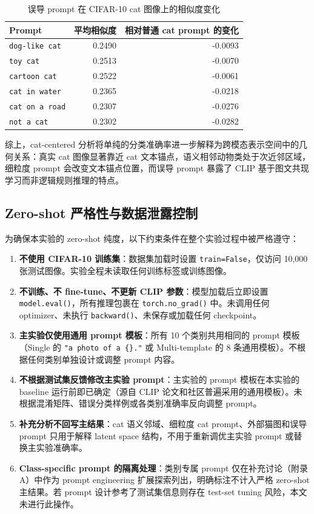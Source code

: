 \documentclass[12pt,a4paper]{ctexart}
\begin{document}
\begin{table}[H]
\centering
\caption{误导 prompt 在 CIFAR-10 cat 图像上的相似度变化}
\label{tab:misleading-prompts}
\begin{tabular}{lrr}
\toprule
Prompt & 平均相似度 & 相对普通 cat prompt 的变化 \\
\midrule
\texttt{dog-like cat} & 0.2490 & -0.0093 \\
\texttt{toy cat}      & 0.2513 & -0.0070 \\
\texttt{cartoon cat}  & 0.2522 & -0.0061 \\
\texttt{cat in water} & 0.2365 & -0.0218 \\
\texttt{cat on a road}& 0.2307 & -0.0276 \\
\texttt{not a cat}    & 0.2302 & -0.0282 \\
\bottomrule
\end{tabular}
\end{table}

综上，cat-centered 分析将单纯的分类准确率进一步解释为跨模态表示空间中的几何关系：真实 cat 图像显著靠近 cat 文本锚点，语义相邻动物类处于次近邻区域，细粒度 prompt 会改变文本锚点位置，而误导 prompt 暴露了 CLIP 基于图文共现学习而非逻辑规则推理的特点。

\subsection{Zero-shot 严格性与数据泄露控制}

为确保本实验的 zero-shot 纯度，以下约束条件在整个实验过程中被严格遵守：

\begin{enumerate}
    \item \textbf{不使用 CIFAR-10 训练集}：数据集加载时设置 \texttt{train=False}，仅访问 10,000 张测试图像。实验全程未读取任何训练标签或训练图像。
    \item \textbf{不训练、不 fine-tune、不更新 CLIP 参数}：模型加载后立即设置 \texttt{model.eval()}，所有推理包裹在 \texttt{torch.no\_grad()} 中。未调用任何 optimizer、未执行 \texttt{backward()}、未保存或加载任何 checkpoint。
    \item \textbf{主实验仅使用通用 prompt 模板}：所有 10 个类别共用相同的 prompt 模板（Single 的 \texttt{"a photo of a \{\}."} 或 Multi-template 的 8 条通用模板）。不根据任何类别单独设计或调整 prompt 内容。
    \item \textbf{不根据测试集反馈修改主实验 prompt}：主实验的 prompt 模板在本实验的 baseline 运行前即已确定（源自 CLIP 论文和社区普遍采用的通用模板）。未根据混淆矩阵、错误分类样例或各类别准确率反向调整 prompt。
    \item \textbf{补充分析不回写主结果}：cat 语义邻域、细粒度 cat prompt、外部猫图和误导 prompt 只用于解释 latent space 结构，不用于重新调优主实验 prompt 或替换主实验准确率。
    \item \textbf{Class-specific prompt 的隔离处理}：类别专属 prompt 仅在补充讨论（附录 A）中作为 prompt engineering 扩展探索列出，明确标注不计入严格 zero-shot 主结果。若 prompt 设计参考了测试集信息则存在 test-set tuning 风险，本文未进行此操作。
\end{enumerate}
\end{document}
